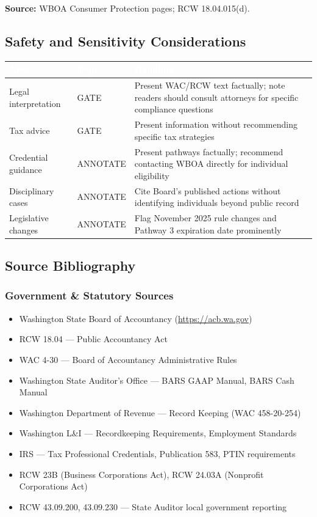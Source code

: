 \documentclass[11pt,letterpaper]{article}
\newcommand{\tableheader}[1]{\textbf{\sffamily\textcolor{white}{#1}}}
\begin{document}
\textbf{Source:} WBOA Consumer Protection pages; RCW 18.04.015(d).

\subsection{Safety and Sensitivity Considerations}

\begin{center}
\begin{tabularx}{\textwidth}{L{3cm}L{2cm}X}
\toprule
{}
\tableheader{Area} & \tableheader{Type} & \tableheader{Handling} \\
\midrule
Legal interpretation & GATE & Present WAC/RCW text factually; note readers should consult attorneys for specific compliance questions \\
Tax advice & GATE & Present information without recommending specific tax strategies \\
Credential guidance & ANNOTATE & Present pathways factually; recommend contacting WBOA directly for individual eligibility \\
Disciplinary cases & ANNOTATE & Cite Board's published actions without identifying individuals beyond public record \\
Legislative changes & ANNOTATE & Flag November 2025 rule changes and Pathway 3 expiration date prominently \\
\bottomrule
\end{tabularx}
\end{center}

\subsection{Source Bibliography}

\subsubsection*{Government \& Statutory Sources}
\begin{itemize}[leftmargin=2em]
  \item Washington State Board of Accountancy (\url{https://acb.wa.gov})
  \item RCW 18.04 --- Public Accountancy Act
  \item WAC 4-30 --- Board of Accountancy Administrative Rules
  \item Washington State Auditor's Office --- BARS GAAP Manual, BARS Cash Manual
  \item Washington Department of Revenue --- Record Keeping (WAC 458-20-254)
  \item Washington L\&I --- Recordkeeping Requirements, Employment Standards
  \item IRS --- Tax Professional Credentials, Publication 583, PTIN requirements
  \item RCW 23B (Business Corporations Act), RCW 24.03A (Nonprofit Corporations Act)
  \item RCW 43.09.200, 43.09.230 --- State Auditor local government reporting
\end{itemize}
\end{document}
